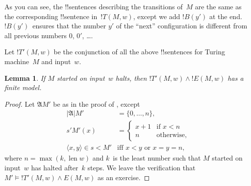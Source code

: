 \documentclass[10pt,a4paper]{article}
\makeatletter
\theoremstyle{plain}
\newtheorem{lem}[thm]{Lemma}
\theoremstyle{definition}
\theoremstyle{remark}
\newcommand*{\ollabel}[1]{\label{#1}}
\newcommand{\olref}{\@ifnextchar[{\olref@i}{\olref@final}}
\def\olref@i[#1]{\@ifnextchar[{\olref@ii}{\olref@final}}
\def\olref@ii[#1]{\@ifnextchar[{\olref@iii}{\olref@final}}
\def\olref@iii[#1]{\olref@final}
\def\olref@final#1{\ref{#1}}
\providecommand{\lif}{\mathbin{\rightarrow}}
\providecommand{\lforall}{\mathord{\forall}}
\providecommand{\Obj}{}
\providecommand{\Struct}{\ensuremath{\mathfrak{A}}}
\providecommand{\Domain}{\ensuremath{|\mathfrak{A}|}}
\providecommand{\Assign}{\ensuremath{s}}
\providecommand{\Sat}[2]{\ensuremath{#1 \models #2}}
\providecommand{\tuple}[1]{\langle #1 \rangle}
\providecommand{\len}{\operatorname{len}}
\makeatother
\begin{document}
\begin{enumerate}
As you can see, the !!{sentence}s describing the transitions of~$M$ 
are the same as the corresponding !!{sentence}
in~$!T(M,w)$, except we add $!B(y')$ at the end. $!B(y')$~ensures
that the number $y'$ of the ``next'' configuration is different from
all previous numbers $\Obj 0$, $\Obj 0'$, \dots.
\end{enumerate}
Let $!T'(M, w)$ be the conjunction of all the above !!{sentence}s for Turing
machine~$M$ and input~$w$.

\begin{lem}\ollabel{lem:halts-sat}
  If $M$ started on input~$w$ halts, then $!T'(M,w) \land !E(M,w)$ has
  a finite model.
\end{lem}

\begin{proof}
  Let $\Struct{M'}$ be as in the proof of
  \olref[ver]{lem:halt-if-valid}, except
  \begin{align*}
    \Domain{M'} & = \{0, \dots, n\},\\
    \Assign{\prime}{M'}(x) & = 
    \begin{cases}
      x + 1 &\text{if $x < n$}\\
      n &\text{otherwise,}
    \end{cases} \\
    \tuple{x,y} \in \Assign{<}{M'} &\text{iff $x < y$ or $x = y = n$,}
  \end{align*}
  where $n = \max(k,\len{w})$ and $k$~is the least number such that
  $M$ started on input~$w$ has halted after~$k$ steps. We leave the
  verification that $\Sat{M'}{!T'(M,w) \land E(M,w)}$ as an exercise.
\end{proof}
\end{document}
